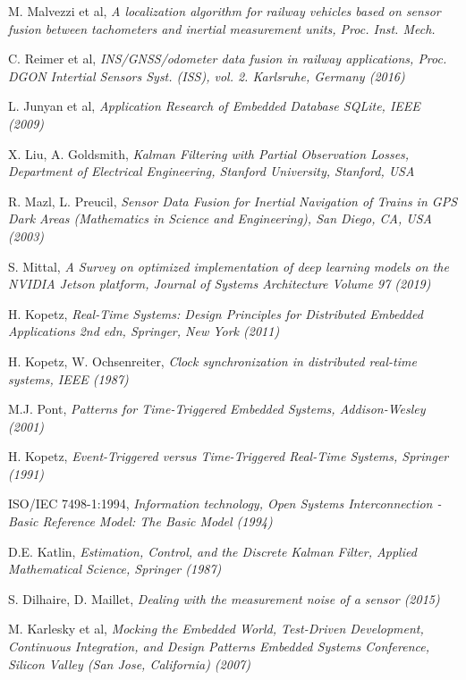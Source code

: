 \begin{thebibliography}{9}
M. Malvezzi et al, \textit{A localization algorithm for railway vehicles based on sensor fusion between tachometers and inertial measurement units, Proc. Inst. Mech.}

C. Reimer et al, \textit{INS/GNSS/odometer
data fusion in railway applications, Proc. DGON Intertial Sensors
Syst. (ISS), vol. 2. Karlsruhe, Germany (2016)} 

L. Junyan et al, \textit{Application Research of Embedded Database SQLite, IEEE (2009)}

X. Liu, A. Goldsmith, \textit{
Kalman  Filtering with Partial Observation Losses, Department of Electrical Engineering, Stanford University, Stanford, USA}

R. Mazl, L. Preucil, \textit{Sensor Data Fusion for Inertial Navigation of
Trains in GPS Dark Areas (Mathematics in Science and Engineering),
San Diego, CA, USA (2003)}

S. Mittal, \textit{A Survey on optimized implementation of deep learning models on the NVIDIA Jetson platform, Journal of Systems Architecture
Volume 97 (2019)}
	

H. Kopetz, \textit{Real-Time Systems: Design Principles for Distributed Embedded Applications 2nd edn, Springer, New York (2011)}

H. Kopetz, W. Ochsenreiter, \textit{Clock synchronization in distributed real-time systems, IEEE (1987)}

M.J. Pont, \emph{Patterns for Time-Triggered Embedded Systems, Addison-Wesley (2001)}

H. Kopetz, \emph{Event-Triggered versus Time-Triggered Real-Time Systems, Springer (1991)}

ISO/IEC 7498-1:1994, \textit{
Information technology, Open Systems Interconnection - Basic Reference Model: The Basic Model (1994)}

D.E. Katlin, \textit{Estimation, Control, and the Discrete Kalman Filter, Applied Mathematical Science, Springer (1987)}

S. Dilhaire, D. Maillet, \textit{Dealing  with the measurement noise of a sensor (2015)}

M. Karlesky et al, \textit{Mocking the Embedded World,
Test-Driven Development, Continuous Integration, and Design Patterns
Embedded Systems Conference, Silicon Valley (San Jose, California)
(2007)}

\end{thebibliography}